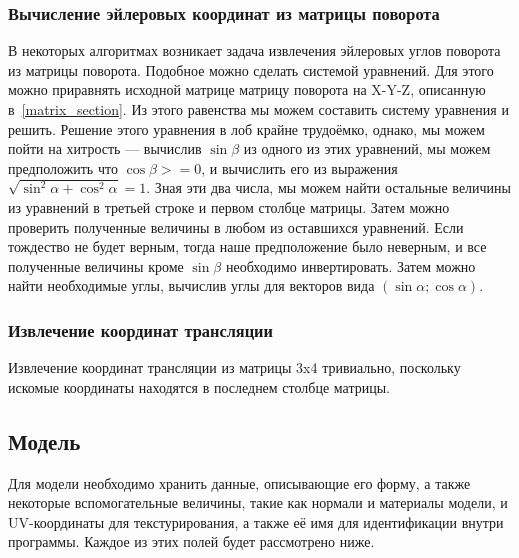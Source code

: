 \documentclass[a4paper,12pt]{report}
\numberwithin{equation}{section}
\begin{document}
\subsubsection{Вычисление эйлеровых координат из матрицы поворота}
В некоторых алгоритмах возникает задача извлечения эйлеровых углов поворота из матрицы поворота. Подобное можно сделать системой уравнений. Для этого можно приравнять исходной матрице матрицу поворота на X-Y-Z, описанную в~\ref{matrix_section}. Из этого равенства мы можем составить систему уравнения и решить. Решение этого уравнения в лоб крайне трудоёмко, однако, мы можем пойти на хитрость --- вычислив $\sin \beta$ из одного из этих уравнений, мы можем предположить что $\cos \beta >= 0$, и вычислить его из выражения $\sqrt{\sin^2 \alpha + \cos^2 \alpha} = 1$. Зная эти два числа, мы можем найти остальные величины из уравнений в третьей строке и первом столбце матрицы. Затем можно проверить полученные величины в любом из оставшихся уравнений. Если тождество не будет верным, тогда наше предположение было неверным, и все полученные величины кроме $\sin \beta$ необходимо инвертировать. Затем можно найти необходимые углы, вычислив углы для векторов вида $(\sin \alpha; \cos \alpha)$.

\subsubsection{Извлечение координат трансляции}
Извлечение координат трансляции из матрицы 3x4 тривиально, поскольку искомые координаты находятся в последнем столбце матрицы.

\subsection{Модель}
Для модели необходимо хранить данные, описывающие его форму, а также некоторые вспомогательные величины, такие как нормали и материалы модели, и UV-координаты для текстурирования, а также её имя для идентификации внутри программы. Каждое из этих полей будет рассмотрено ниже.
\end{document}

